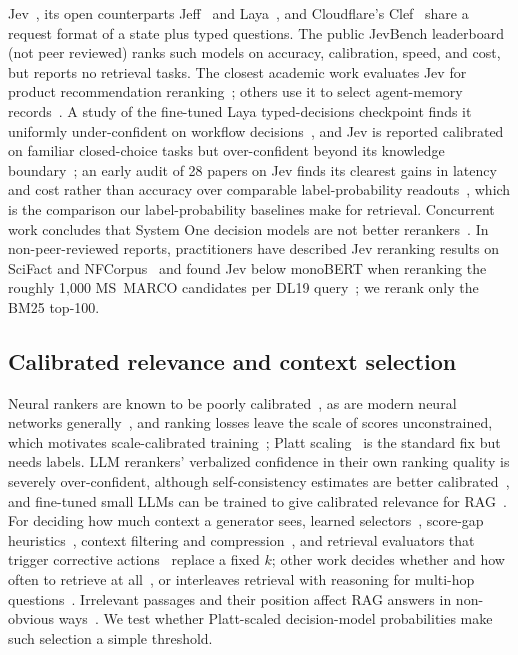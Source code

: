 Jev~\cite{jev}, its open counterparts Jeff~\cite{jeff} and Laya~\cite{laya}, and Cloudflare's Clef~\cite{clef} share a request format of a state plus typed questions.
The public JevBench leaderboard~\cite{jevbench} (not peer reviewed) ranks such models on accuracy, calibration, speed, and cost, but reports no retrieval tasks.
The closest academic work evaluates Jev for product recommendation reranking~\cite{lyu2026jevrec}; others use it to select agent-memory records~\cite{sharma2026selection}.
A study of the fine-tuned Laya typed-decisions checkpoint finds it uniformly under-confident on workflow decisions~\cite{laya2026assessor}, and Jev is reported calibrated on familiar closed-choice tasks but over-confident beyond its knowledge boundary~\cite{jev2026selfknowledge}; an early audit of 28 papers on Jev finds its clearest gains in latency and cost rather than accuracy over comparable label-probability readouts~\cite{tang2026tdmaudit}, which is the comparison our label-probability baselines make for retrieval. Concurrent work concludes that System One decision models are not better rerankers~\cite{dinzinger2026systemone}.
In non-peer-reviewed reports, practitioners have described Jev reranking results on SciFact and NFCorpus~\cite{denser2026jevqwen} and found Jev below monoBERT when reranking the roughly 1{,}000 MS~MARCO candidates per DL19 query~\cite{carlaiau2026protocol}; we rerank only the BM25 top-100.

\subsection{Calibrated relevance and context selection}

Neural rankers are known to be poorly calibrated~\cite{penha2021calibration}, as are modern neural networks generally~\cite{guo2017calibration}, and ranking losses leave the scale of scores unconstrained, which motivates scale-calibrated training~\cite{yan2022scale}; Platt scaling~\cite{platt1999} is the standard fix but needs labels. LLM rerankers' verbalized confidence in their own ranking quality is severely over-confident, although self-consistency estimates are better calibrated~\cite{ni2026predict}, and fine-tuned small LLMs can be trained to give calibrated relevance for RAG~\cite{diras2024}.
For deciding how much context a generator sees, learned selectors~\cite{meng2025dps}, score-gap heuristics~\cite{adaptivek2025}, context filtering and compression~\cite{wang2023filco,xu2024recomp,chirkova2025provence}, and retrieval evaluators that trigger corrective actions~\cite{yan2024crag} replace a fixed $k$; other work decides whether and how often to retrieve at all~\cite{asai2024selfrag,jeong2024adaptiverag}, or interleaves retrieval with reasoning for multi-hop questions~\cite{trivedi2023ircot}. Irrelevant passages and their position affect RAG answers in non-obvious ways~\cite{cuconasu2024noise,liu2024lost}.
We test whether Platt-scaled decision-model probabilities make such selection a simple threshold.
